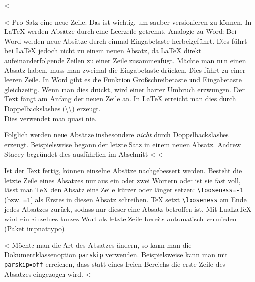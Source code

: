 <%

<%
Pro Satz eine neue Zeile.
Das ist wichtig, um sauber versionieren zu können.
In LaTeX werden Absätze durch eine Leerzeile getrennt.
Analogie zu Word: Bei Word werden neue Absätze durch einmal Eingabetaste herbeigeführt.
Dies führt bei LaTeX jedoch nicht zu einem neuen Absatz, da LaTeX direkt aufeinanderfolgende Zeilen zu einer Zeile zusammenfügt.
Mächte man nun einen Absatz haben, muss man zweimal die Eingabetaste drücken.
Dies führt zu einer leeren Zeile.
In Word gibt es die Funktion Großschreibetaste und Eingabetaste gleichzeitig.
Wenn man dies drückt, wird einer harter Umbruch erzwungen.
Der Text fängt am Anfang der neuen Zeile an.
In LaTeX erreicht man dies durch Doppelbackslashes (\textbackslash\textbackslash) erzeugt.
\\
Dies verwendet man quasi nie.

Folglich werden neue Absätze insbesondere \emph{nicht} durch Doppelbackslashes erzeugt.
Beispielsweise begann der letzte Satz in einem neuen Absatz.
Andrew Stacey begründet dies ausführlich im Abschnitt <%
<%

Ist der Text fertig, können einzelne Absätze nachgebessert werden.
Besteht die letzte Zeile eines Absatzes nur aus ein oder zwei Wörtern oder ist sie fast voll, lässt man TeX den Absatz eine Zeile kürzer oder länger setzen: \texttt{\textbackslash looseness=-1} (bzw. \texttt{=1}) als Erstes in diesen Absatz schreiben.
TeX setzt \texttt{\textbackslash looseness} am Ende jedes Absatzes zurück, sodass nur dieser eine Absatz betroffen ist.
Mit LuaLaTeX wird ein einzelnes kurzes Wort als letzte Zeile bereits automatisch vermieden (Paket impnattypo).

<%
Möchte man die Art des Absatzes ändern, so kann man die Dokumentklassenoption \texttt{parskip} verwenden.
Beispielsweise kann man mit \texttt{parskip=off} erreichen, dass statt eines freien Bereichs die erste Zeile des Absatzes eingezogen wird.
<%
